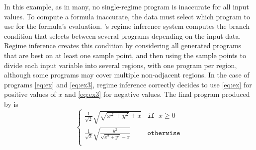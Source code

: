 \documentclass[paper.tex]{subfiles}
\begin{document}
In this example, as in many,
  no single-regime program is inaccurate for all input values.
To compute a formula inaccurate, the data must select
  which program to use for the formula's evaluation.
\casio's regime inference system
  computes the branch condition
  that selects between several programs depending on the input data.
Regime inference creates this condition
  by considering all generated programs
  that are best on at least one sample point,
  and then using the sample points to divide each input variable
  into several regions, with one program per region,
  although some programs may cover multiple non-adjacent regions.
In the case of programs \eqref{eq:ex} and \eqref{eq:ex3},
  regime inference correctly decides
  to use \eqref{eq:ex} for positive values of $x$
  and \eqref{eq:ex3} for negative values.
The final program produced by \casio is
\[
\begin{cases}
  \frac1{\sqrt2} \sqrt{\sqrt{x^2 + y^2} + x} & \mathtt{if} \;\; x \ge 0 \\[8pt]
  \frac1{\sqrt2} \sqrt{\frac{y^2}{\sqrt{x^2 + y^2} - x}} & \mathtt{otherwise} \\
\end{cases}
\]
\end{document}
